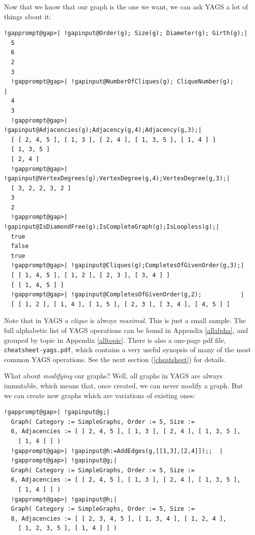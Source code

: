 \documentclass[a4paper,11pt]{report}
\begin{document}
{{Now that we know that our graph is the one we want, we can ask \textsf{YAGS} a lot of things about it: 

 
\begin{Verbatim}[commandchars=!@|,fontsize=\small,frame=single,label=Example]
  !gapprompt@gap>| !gapinput@Order(g); Size(g); Diameter(g); Girth(g);|
  5
  6
  2
  3
  !gapprompt@gap>| !gapinput@NumberOfCliques(g); CliqueNumber(g);                  |
  4
  3
  !gapprompt@gap>| !gapinput@Adjacencies(g);Adjacency(g,4);Adjacency(g,3);|
  [ [ 2, 4, 5 ], [ 1, 3 ], [ 2, 4 ], [ 1, 3, 5 ], [ 1, 4 ] ]
  [ 1, 3, 5 ]
  [ 2, 4 ]
  !gapprompt@gap>| !gapinput@VertexDegrees(g);VertexDegree(g,4);VertexDegree(g,3);|
  [ 3, 2, 2, 3, 2 ]
  3
  2
  !gapprompt@gap>| !gapinput@IsDiamondFree(g);IsCompleteGraph(g);IsLoopless(g);|
  true
  false
  true
  !gapprompt@gap>| !gapinput@Cliques(g);CompletesOfGivenOrder(g,3);|
  [ [ 1, 4, 5 ], [ 1, 2 ], [ 2, 3 ], [ 3, 4 ] ]
  [ [ 1, 4, 5 ] ]
  !gapprompt@gap>| !gapinput@CompletesOfGivenOrder(g,2);           |
  [ [ 1, 2 ], [ 1, 4 ], [ 1, 5 ], [ 2, 3 ], [ 3, 4 ], [ 4, 5 ] ]
\end{Verbatim}
 

Note that in \textsf{YAGS} a \emph{clique} is always \emph{maximal}. This is just a small sample. The full alphabetic list of \textsf{YAGS} operations can be found in Appendix \ref{allalpha}, and grouped by topic in Appendix \ref{alltopic}. There is also a one-page pdf file, \texttt{cheatsheet-yags.pdf}, which contains a very useful synopsis of many of the most common \textsf{YAGS} operations. See the next section (\ref{cheatsheet}) for details. 

What about \emph{modifying} our graphs? Well, all graphs in \textsf{YAGS} are always immutable, which means that, once created, we can never modify a
graph. But we can create new graphs which are variations of existing ones: 

 
\begin{Verbatim}[commandchars=!@|,fontsize=\small,frame=single,label=Example]
  !gapprompt@gap>| !gapinput@g;|
  Graph( Category := SimpleGraphs, Order := 5, Size := 
  6, Adjacencies := [ [ 2, 4, 5 ], [ 1, 3 ], [ 2, 4 ], [ 1, 3, 5 ], 
    [ 1, 4 ] ] )
  !gapprompt@gap>| !gapinput@h:=AddEdges(g,[[1,3],[2,4]]);;  |
  !gapprompt@gap>| !gapinput@g;|
  Graph( Category := SimpleGraphs, Order := 5, Size := 
  6, Adjacencies := [ [ 2, 4, 5 ], [ 1, 3 ], [ 2, 4 ], [ 1, 3, 5 ], 
    [ 1, 4 ] ] )
  !gapprompt@gap>| !gapinput@h;|
  Graph( Category := SimpleGraphs, Order := 5, Size := 
  8, Adjacencies := [ [ 2, 3, 4, 5 ], [ 1, 3, 4 ], [ 1, 2, 4 ], 
    [ 1, 2, 3, 5 ], [ 1, 4 ] ] )
\end{Verbatim}
 

}}
\end{document}
